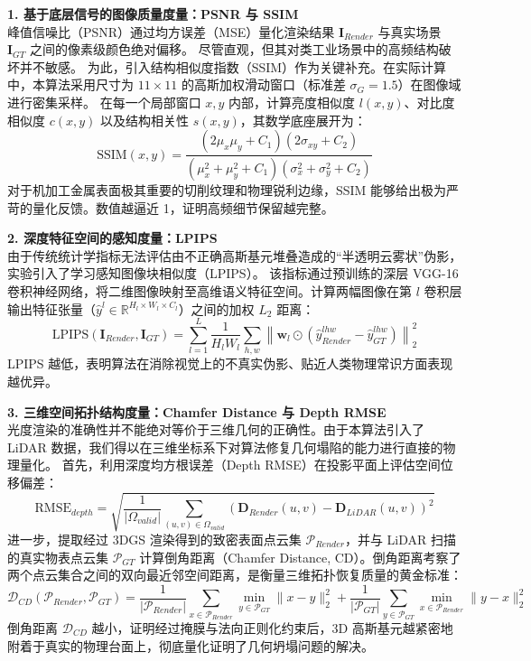 \textbf{1. 基于底层信号的图像质量度量：PSNR 与 SSIM} \\
峰值信噪比（PSNR）通过均方误差（MSE）量化渲染结果 $\bm{I}_{Render}$ 与真实场景 $\bm{I}_{GT}$ 之间的像素级颜色绝对偏移。
尽管直观，但其对类工业场景中的高频结构破坏并不敏感。
为此，引入结构相似度指数（SSIM）作为关键补充。在实际计算中，本算法采用尺寸为 $11 \times 11$ 的高斯加权滑动窗口（标准差 $\sigma_G = 1.5$）在图像域进行密集采样。
在每一个局部窗口 $x, y$ 内部，计算亮度相似度 $l(x,y)$、对比度相似度 $c(x,y)$ 以及结构相关性 $s(x,y)$，其数学底座展开为：
\begin{equation}
    \text{SSIM}(x, y) = \frac{(2\mu_x\mu_y + C_1)(2\sigma_{xy} + C_2)}{(\mu_x^2 + \mu_y^2 + C_1)(\sigma_x^2 + \sigma_y^2 + C_2)}
\end{equation}
对于机加工金属表面极其重要的切削纹理和物理锐利边缘，SSIM 能够给出极为严苛的量化反馈。数值越逼近 1，证明高频细节保留越完整。


\textbf{2. 深度特征空间的感知度量：LPIPS} \\
由于传统统计学指标无法评估由不正确高斯基元堆叠造成的“半透明云雾状”伪影，实验引入了学习感知图像块相似度（LPIPS）。
该指标通过预训练的深层 VGG-16 卷积神经网络，将二维图像映射至高维语义特征空间。计算两幅图像在第 $l$ 卷积层输出特征张量（$\hat{y}^l \in \mathbb{R}^{H_l \times W_l \times C_l}$）之间的加权 $L_2$ 距离：
\begin{equation}
    \text{LPIPS}(\bm{I}_{Render}, \bm{I}_{GT}) = \sum_{l=1}^{L} \frac{1}{H_l W_l} \sum_{h,w} \left\| \bm{w}_l \odot \left( \hat{y}_{Render}^{lhw} - \hat{y}_{GT}^{lhw} \right) \right\|_2^2
\end{equation}
LPIPS 越低，表明算法在消除视觉上的不真实伪影、贴近人类物理常识方面表现越优异。

\textbf{3. 三维空间拓扑结构度量：Chamfer Distance 与 Depth RMSE} \\
光度渲染的准确性并不能绝对等价于三维几何的正确性。由于本算法引入了 LiDAR 数据，我们得以在三维坐标系下对算法修复几何塌陷的能力进行直接的物理量化。
首先，利用深度均方根误差（Depth RMSE）在投影平面上评估空间位移偏差：
\begin{equation}
    \text{RMSE}_{depth} = \sqrt{ \frac{1}{|\Omega_{valid}|} \sum_{(u,v) \in \Omega_{valid}} \left( \bm{D}_{Render}(u,v) - \bm{D}_{LiDAR}(u,v) \right)^2 }
\end{equation}
进一步，提取经过 3DGS 渲染得到的致密表面点云集 $\mathcal{P}_{Render}$，并与 LiDAR 扫描的真实物表点云集 $\mathcal{P}_{GT}$ 计算倒角距离（Chamfer Distance, CD）。倒角距离考察了两个点云集合之间的双向最近邻空间距离，是衡量三维拓扑恢复质量的黄金标准：
\begin{equation}
    \mathcal{D}_{CD}(\mathcal{P}_{Render}, \mathcal{P}_{GT}) = \frac{1}{|\mathcal{P}_{Render}|} \sum_{x \in \mathcal{P}_{Render}} \min_{y \in \mathcal{P}_{GT}} \|x - y\|_2^2 + \frac{1}{|\mathcal{P}_{GT}|} \sum_{y \in \mathcal{P}_{GT}} \min_{x \in \mathcal{P}_{Render}} \|y - x\|_2^2
\end{equation}
倒角距离 $\mathcal{D}_{CD}$ 越小，证明经过掩膜与法向正则化约束后，3D 高斯基元越紧密地附着于真实的物理台面上，彻底量化证明了几何坍塌问题的解决。


